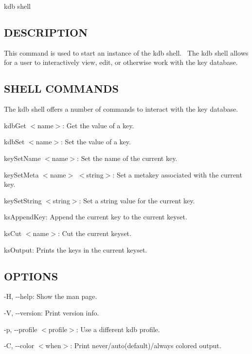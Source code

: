 {\ttfamily kdb shell}

\subsection*{D\+E\+S\+C\+R\+I\+P\+T\+I\+ON}

This command is used to start an instance of the kdb shell.~\newline
 The kdb shell allows for a user to interactively view, edit, or otherwise work with the key database.~\newline


\subsection*{S\+H\+E\+LL C\+O\+M\+M\+A\+N\+DS}

The kdb shell offers a number of commands to interact with the key database.


\begin{DoxyItemize}
\item {\ttfamily kdb\+Get $<$name$>$}\+: Get the value of a key.
\item {\ttfamily kdb\+Set $<$name$>$}\+: Set the value of a key.
\item {\ttfamily key\+Set\+Name $<$name$>$}\+: Set the name of the current key.
\item {\ttfamily key\+Set\+Meta $<$name$>$ $<$string$>$}\+: Set a metakey associated with the current key.
\item {\ttfamily key\+Set\+String $<$string$>$}\+: Set a string value for the current key.
\item {\ttfamily ks\+Append\+Key}\+: Append the current key to the current keyset.
\item {\ttfamily ks\+Cut $<$name$>$}\+: Cut the current keyset.
\item {\ttfamily ks\+Output}\+: Prints the keys in the current keyset.
\end{DoxyItemize}

\subsection*{O\+P\+T\+I\+O\+NS}


\begin{DoxyItemize}
\item {\ttfamily -\/H}, {\ttfamily -\/-\/help}\+: Show the man page.
\item {\ttfamily -\/V}, {\ttfamily -\/-\/version}\+: Print version info.
\item {\ttfamily -\/p}, {\ttfamily -\/-\/profile $<$profile$>$}\+: Use a different kdb profile.
\item {\ttfamily -\/C}, {\ttfamily -\/-\/color $<$when$>$}\+: Print never/auto(default)/always colored output.
\end{DoxyItemize}


